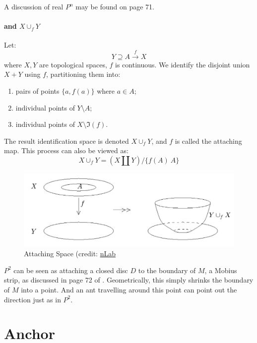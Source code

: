 \documentclass{article}
\begin{document}
\begin{defi}
    A discussion of real $P^n$ may be found on page 71.
\end{defi}

\paragraph{ and $X\cup_f Y$} Let:
\begin{equation}
    Y \supseteq A \overset{f}{\to} X
\end{equation}
where $X,Y$ are topological spaces, $f$ is continuous. We identify the
disjoint union $X+Y$ using $f$, partitioning them into:
\begin{enumerate}
    \item pairs of points $\{a,f(a)\}$ where $a\in A$;
    \item individual points of $Y\setminus A$;
    \item individual points of $X\setminus \Im(f)$.
\end{enumerate}
The result identification space is denoted $X\cup_f Y$, and $f$ is
called the attaching map. This process can also be viewed as:
\begin{equation}
    X\cup_f Y = (X\amalg Y)/\{f(A)~A\}
\end{equation}
\begin{figure}[H]
    \centering
    \includegraphics[width=0.6\linewidth]{pics/Attaching-Space.jpg}
    \caption{Attaching Space (credit:
        \href{https://ncatlab.org/nlab/show/Top}{nLab}}
\end{figure}
\begin{ex}
    $P^2$ can be seen as attaching a closed disc $D$ to the boundary
    of $M$, a Mobius strip, as discussed in page 72 of \cite{book}.
    Geometrically, this simply shrinks the boundary of $M$ into a
    point. And an ant travelling around this point can point out the
    direction just as in $P^2$.
\end{ex}

\section{Anchor}
\label{sec:Anchor}
\end{document}
